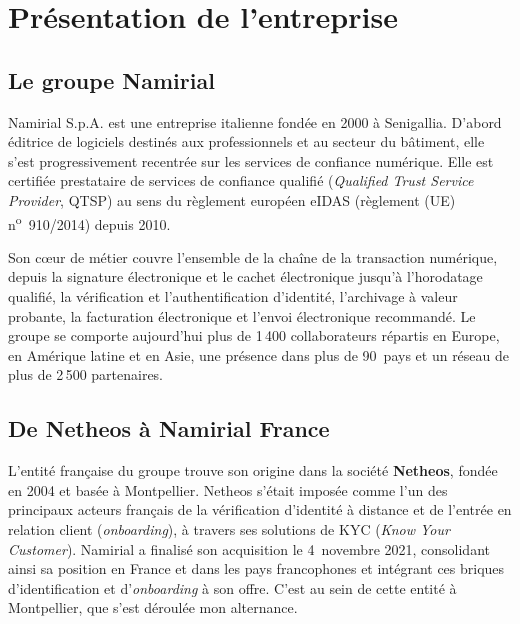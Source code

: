 \chapter{Présentation de l'entreprise}


\section{Le groupe Namirial}

Namirial S.p.A. est une entreprise italienne fondée en 2000 à Senigallia. D'abord éditrice de logiciels destinés aux professionnels et au
secteur du bâtiment, elle s'est progressivement recentrée sur les services de
confiance numérique. Elle est certifiée prestataire de services de confiance qualifié
(\emph{Qualified Trust Service Provider}, QTSP) au sens du règlement européen eIDAS
(règlement (UE) n\textsuperscript{o}~910/2014) depuis 2010.

Son cœur de métier couvre l'ensemble de la chaîne de la transaction numérique,
depuis la signature électronique et le cachet électronique jusqu'à l'horodatage
qualifié, la vérification et l'authentification d'identité, l'archivage à valeur
probante, la facturation électronique et l'envoi électronique recommandé. Le groupe se comporte aujourd'hui plus de 1\,400
collaborateurs répartis en Europe, en Amérique latine et en Asie, une présence dans
plus de 90~pays et un réseau de plus de 2\,500 partenaires.

\section{De Netheos à Namirial France}

L'entité française du groupe trouve son origine dans la société \textbf{Netheos},
fondée en 2004 et basée à Montpellier. Netheos s'était imposée comme l'un des
principaux acteurs français de la vérification d'identité à distance et de l'entrée en
relation client (\emph{onboarding}), à travers ses solutions de KYC
(\emph{Know Your Customer}). Namirial a finalisé son acquisition le 4~novembre 2021,
consolidant ainsi sa position en France et dans les pays francophones et intégrant ces
briques d'identification et d'\emph{onboarding} à son offre. C'est au sein de cette
entité à Montpellier, que s'est déroulée mon alternance.

